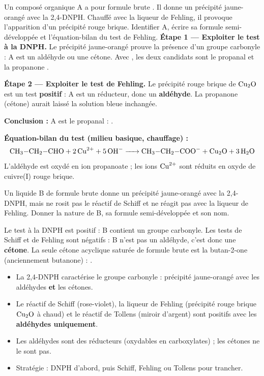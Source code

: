 \documentclass[11pt]{article}
\newcommand{\cle}[1]{{\popxbold\color{popdark}#1}}
\begin{document}
\begin{exoresolu}
Un composé organique A a pour formule brute . Il donne un précipité jaune-orangé avec la 2,4-DNPH. Chauffé avec la liqueur de Fehling, il provoque l'apparition d'un précipité rouge brique. Identifier A, écrire sa formule semi-développée et l'équation-bilan du test de Fehling.
\tcblower
\textbf{Étape 1 — Exploiter le test à la DNPH.} Le précipité jaune-orangé prouve la présence d'un groupe carbonyle : A est un aldéhyde ou une cétone. Avec , les deux candidats sont le \cle{propanal}  et la \cle{propanone} .

\textbf{Étape 2 — Exploiter le test de Fehling.} Le précipité rouge brique de $\ce{Cu2O}$ est un test \textbf{positif} : A est un réducteur, donc un \textbf{aldéhyde}. La propanone (cétone) aurait laissé la solution bleue inchangée.

\textbf{Conclusion :} A est le \cle{propanal} : .

\textbf{Équation-bilan du test (milieu basique, chauffage) :}
\[ \ce{CH3-CH2-CHO + 2Cu^2+ + 5OH- -> CH3-CH2-COO- + Cu2O + 3H2O} \]
L'aldéhyde est oxydé en ion propanoate ; les ions $\ce{Cu^2+}$ sont réduits en oxyde de cuivre(I) rouge brique.
\end{exoresolu}

\begin{exercice}
Un liquide B de formule brute  donne un précipité jaune-orangé avec la 2,4-DNPH, mais ne rosit pas le réactif de Schiff et ne réagit pas avec la liqueur de Fehling. Donner la nature de B, sa formule semi-développée et son nom.
\end{exercice}

\begin{corrige}[Exercice 1]
Le test à la DNPH est positif : B contient un groupe carbonyle. Les tests de Schiff et de Fehling sont négatifs : B n'est pas un aldéhyde, c'est donc une \textbf{cétone}. La seule cétone acyclique saturée de formule brute  est la \cle{butan-2-one} (anciennement butanone) : .
\end{corrige}

\begin{aretenir}
\begin{itemize}
\item La \cle{2,4-DNPH} caractérise le groupe carbonyle : précipité jaune-orangé avec les aldéhydes \textbf{et} les cétones.
\item Le \cle{réactif de Schiff} (rose-violet), la \cle{liqueur de Fehling} (précipité rouge brique $\ce{Cu2O}$ à chaud) et le \cle{réactif de Tollens} (miroir d'argent) sont positifs avec les \textbf{aldéhydes uniquement}.
\item Les aldéhydes sont des \cle{réducteurs} (oxydables en carboxylates) ; les cétones ne le sont pas.
\item Stratégie : DNPH d'abord, puis Schiff, Fehling ou Tollens pour trancher.
\end{itemize}
\end{aretenir}
\end{document}
